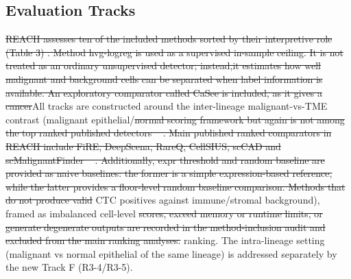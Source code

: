 \documentclass[10pt]{article}
\providecommand{\DIFaddtex}[1]{{\protect\color{trackgreen}#1}} %
\providecommand{\DIFdeltex}[1]{{\protect\color{red}\sout{#1}}}                      %
\providecommand{\DIFaddbegin}{} %
\providecommand{\DIFaddend}{} %
\providecommand{\DIFdelbegin}{} %
\providecommand{\DIFdelend}{} %
\providecommand{\DIFdelbeginFL}{} %
\providecommand{\DIFadd}[1]{\texorpdfstring{\DIFaddtex{#1}}{#1}} %
\providecommand{\DIFdel}[1]{\texorpdfstring{\DIFdeltex{#1}}{}} %
\newcommand{\DIFscaledelfig}{0.5}
\newlength{\DIFdelgraphicswidth} %
\newlength{\DIFdelgraphicsheight} %
\newcommand{\DIFaddincludegraphics}[2][]{{\color{trackgreen}\fbox{\DIFOincludegraphics[#1]{#2}}}} %
\newcommand{\DIFdelincludegraphics}[2][]{%
\sbox{\DIFdelgraphicsbox}{\DIFOincludegraphics[#1]{#2}}%
\settoboxwidth{\DIFdelgraphicswidth}{\DIFdelgraphicsbox} %
\settoboxtotalheight{\DIFdelgraphicsheight}{\DIFdelgraphicsbox} %
\scalebox{\DIFscaledelfig}{%
\parbox[b]{\DIFdelgraphicswidth}{\usebox{\DIFdelgraphicsbox}\\[-\baselineskip] \rule{\DIFdelgraphicswidth}{0em}}\llap{\resizebox{\DIFdelgraphicswidth}{\DIFdelgraphicsheight}{%
\setlength{\unitlength}{\DIFdelgraphicswidth}%
\begin{picture}(1,1)%
\thicklines\linethickness{2pt} %
{\color[rgb]{1,0,0}\put(0,0){\framebox(1,1){}}}%
{\color[rgb]{1,0,0}\put(0,0){\line( 1,1){1}}}%
{\color[rgb]{1,0,0}\put(0,1){\line(1,-1){1}}}%
\end{picture}%
}\hspace*{3pt}}} %
} %
\DeclareRobustCommand{\DIFaddbegin}{\DIFOaddbegin \let\includegraphics\DIFaddincludegraphics} %
\DeclareRobustCommand{\DIFaddend}{\DIFOaddend \let\includegraphics\DIFOincludegraphics} %
\DeclareRobustCommand{\DIFdelbegin}{\DIFOdelbegin \let\includegraphics\DIFdelincludegraphics} %
\DeclareRobustCommand{\DIFdelend}{\DIFOaddend \let\includegraphics\DIFOincludegraphics} %
\DeclareRobustCommand{\DIFdelbeginFL}{\DIFOdelbeginFL \let\includegraphics\DIFdelincludegraphics} %
\begin{document}
\DIFdelbeginFL %
\DIFdelend \DIFaddbegin \subsection{\DIFadd{Evaluation Tracks}}\label{evaluation-tracks}
\DIFaddend 

\DIFdelbegin \DIFdel{REACH assesses ten of the included methods sorted by their interpretive role (Table 3) . Method hvg-logreg is used as a supervised in-sample ceiling. It is not treated as an ordinary unsupervised detector; instead,it estimates how well malignant and background cells can be separated when label information is available. An exploratory comparator called CaSee is included, as it gives a cancer}\DIFdelend \DIFaddbegin \DIFadd{All tracks are constructed around the inter-lineage malignant-vs-TME
contrast (malignant epithelial}\DIFaddend /\DIFdelbegin \DIFdel{normal scoring framework but again is not among the top ranked published detectors \mbox{%
\cite{sh2022casee}}\hskip0pt%
. Main published ranked comparators in REACH include FiRE, DeepScena, RareQ, CellSIUS, scCAD and scMalignantFinder \mbox{%
\cite{wegmann2019cellsius,xu2024sccad,yu2025scmalignantfinder}}\hskip0pt%
. Additionally, expr threshold and random baseline are provided as naive baselines: the former is a simple expression-based reference, while the latter provides a floor-level random baseline comparison.
Methods that do not produce valid }\DIFdelend \DIFaddbegin \DIFadd{CTC positives against immune/stromal
background), framed as imbalanced }\DIFaddend cell-level \DIFdelbegin \DIFdel{scores, exceed memory or runtime limits, or generate degenerate outputs are recorded in the
method-inclusion audit and excluded from the main ranking analyses.
}\DIFdelend \DIFaddbegin \DIFadd{ranking. The intra-lineage
setting (malignant vs normal epithelial of the same lineage) is
addressed separately by the new Track F (R3-4/R3-5).
}\DIFaddend 
\end{document}
